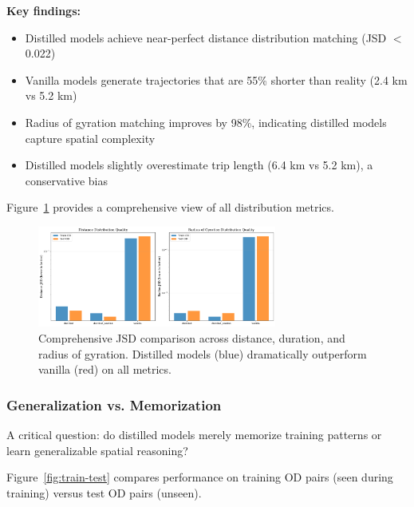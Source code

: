 \textbf{Key findings:}
\begin{itemize}[noitemsep,topsep=0pt]
    \item Distilled models achieve near-perfect distance distribution matching (JSD $<$ 0.022)
    \item Vanilla models generate trajectories that are 55\% shorter than reality (2.4 km vs 5.2 km)
    \item Radius of gyration matching improves by 98\%, indicating distilled models capture spatial complexity
    \item Distilled models slightly overestimate trip length (6.4 km vs 5.2 km), a conservative bias
\end{itemize}

Figure~\ref{fig:jsd-comparison} provides a comprehensive view of all distribution metrics.

\begin{figure}[h]
    \centering
    \includegraphics[width=0.7\textwidth]{assets/plots/hoser/jsd_comparison.pdf}
    \caption{Comprehensive JSD comparison across distance, duration, and radius of gyration. Distilled models (blue) dramatically outperform vanilla (red) on all metrics.}
    \label{fig:jsd-comparison}
\end{figure}

\subsubsection{Generalization vs. Memorization}

A critical question: do distilled models merely memorize training patterns or learn generalizable spatial reasoning?

Figure~\ref{fig:train-test} compares performance on training OD pairs (seen during training) versus test OD pairs (unseen).

